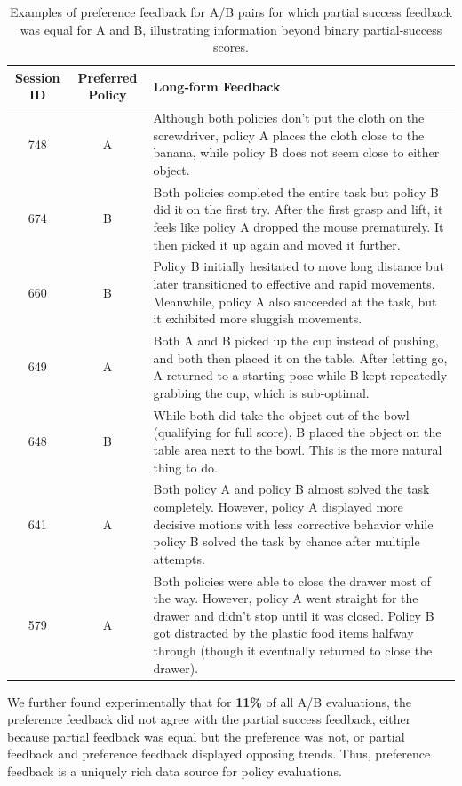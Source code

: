 \begin{table}[ht]
  \centering
  \caption{Examples of preference feedback for A/B pairs for which partial success feedback was equal for A and B, illustrating information beyond binary partial‐success scores.}
  \label{tab:pref_feedback_examples}
  \begin{tabular}{@{}ccp{}@{}}
    \toprule
    Session ID & Preferred Policy & Long‐form Feedback \\
    \midrule
    748 & A & Although both policies don’t put the cloth on the screwdriver, policy A places the cloth close to the banana, while policy B does not seem close to either object. \\
    674 & B & Both policies completed the entire task but policy B did it on the first try. After the first grasp and lift, it feels like policy A dropped the mouse prematurely. It then picked it up again and moved it further. \\
    660 & B & Policy B initially hesitated to move long distance but later transitioned to effective and rapid movements. Meanwhile, policy A also succeeded at the task, but it exhibited more sluggish movements. \\
    649 & A & Both A and B picked up the cup instead of pushing, and both then placed it on the table. After letting go, A returned to a starting pose while B kept repeatedly grabbing the cup, which is sub‐optimal. \\
    648 & B & While both did take the object out of the bowl (qualifying for full score), B placed the object on the table area next to the bowl. This is the more natural thing to do. \\
    641 & A & Both policy A and policy B almost solved the task completely. However, policy A displayed more decisive motions with less corrective behavior while policy B solved the task by chance after multiple attempts. \\
    579 & A & Both policies were able to close the drawer most of the way. However, policy A went straight for the drawer and didn’t stop until it was closed. Policy B got distracted by the plastic food items halfway through (though it eventually returned to close the drawer). \\
    \bottomrule
  \end{tabular}
\end{table}

We further found experimentally that for \textbf{11\%} of all A/B evaluations, the preference feedback did not agree with the partial success feedback, either because partial feedback was equal but the preference was not, or partial feedback and preference feedback displayed opposing trends. Thus, preference feedback is a uniquely rich data source for policy evaluations. 


